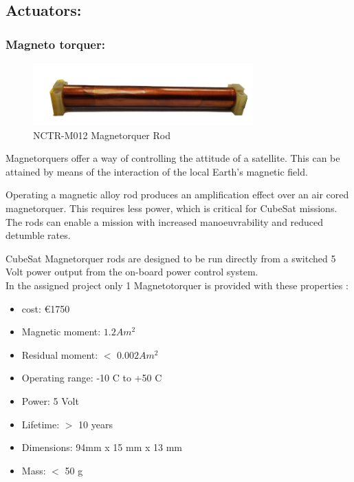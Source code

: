 \documentclass[11pt]{article}
\begin{document}
\subsection{Actuators:}
\subsubsection{Magneto torquer:}
\begin{figure} [H]

\centering 

\includegraphics[scale=0.8]{Magneto_torquers.PNG}


\caption{ NCTR-M012 Magnetorquer Rod
\cite{magneto_torque}}
\label{rod}
\end{figure}

Magnetorquers offer a way of controlling the attitude of a satellite. This can be attained  by means of the interaction of  the local Earth's magnetic field.

Operating a magnetic alloy rod produces an amplification effect over an air cored magnetorquer. This requires less power, which is critical for CubeSat missions. The rods can enable a mission with increased manoeuvrability and reduced detumble rates.

CubeSat Magnetorquer rods are designed to be run directly from a switched 5 Volt power output from the on-board power control system.\\In the assigned project only 1 Magnetotorquer is provided with these properties \cite{magneto_torque}:
\begin{multicols}{2}
\begin{itemize}
\item cost: \euro{1750}
\item Magnetic moment: $1.2 Am^2$
\item Residual moment: $<$ $0.002 Am^2$
\item Operating range: -10 \degree C to +50 \degree C
\item Power: 5 Volt
\item Lifetime: $>$ 10 years
\item Dimensions: 94mm x 15 mm x 13 mm
\item Mass: $<$ 50 g

\end{itemize}
\end{multicols}
\end{document}
